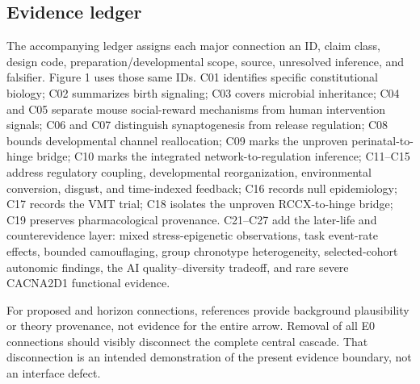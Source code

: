 \subsection{Evidence ledger}

The accompanying ledger assigns each major connection an ID, claim class, design code, preparation/developmental scope, source, unresolved inference, and falsifier. Figure 1 uses those same IDs. C01 identifies specific constitutional biology; C02 summarizes birth signaling; C03 covers microbial inheritance; C04 and C05 separate mouse social-reward mechanisms from human intervention signals; C06 and C07 distinguish synaptogenesis from release regulation; C08 bounds developmental channel reallocation; C09 marks the unproven perinatal-to-hinge bridge; C10 marks the integrated network-to-regulation inference; C11–C15 address regulatory coupling, developmental reorganization, environmental conversion, disgust, and time-indexed feedback; C16 records null epidemiology; C17 records the VMT trial; C18 isolates the unproven RCCX-to-hinge bridge; C19 preserves pharmacological provenance. C21–C27 add the later-life and counterevidence layer: mixed stress-epigenetic observations, task event-rate effects, bounded camouflaging, group chronotype heterogeneity, selected-cohort autonomic findings, the AI quality–diversity tradeoff, and rare severe CACNA2D1 functional evidence.

For proposed and horizon connections, references provide background plausibility or theory provenance, not evidence for the entire arrow. Removal of all E0 connections should visibly disconnect the complete central cascade. That disconnection is an intended demonstration of the present evidence boundary, not an interface defect.

